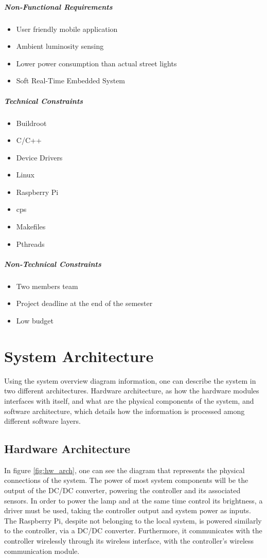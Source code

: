 \subparagraph{Non-Functional Requirements}
\begin{itemize}
	\item User friendly mobile application
	\item Ambient luminosity sensing
	\item Lower power consumption than actual street lights
	\item Soft Real-Time Embedded System
\end{itemize}

\subparagraph{Technical Constraints}
\begin{itemize}
	\item Buildroot
	\item C/C++ 
	\item Device Drivers
	\item Linux
	\item Raspberry Pi
	\item \ac{cps}
	\item Makefiles
	\item Pthreads
\end{itemize}

\subparagraph{Non-Technical Constraints}
\begin{itemize}
	\item Two members team
	\item Project deadline at the end of the semester
	\item Low budget
	
\end{itemize}

\section{System Architecture}
Using the system overview diagram information, one can describe the system in two different architectures. Hardware architecture, as how the hardware modules interfaces with itself, and what are the physical components of the system, and software architecture, which details how the information is processed among different software layers.

\subsection{Hardware Architecture}
In figure \ref{fig:hw_arch}, one can see the diagram that represents the physical connections of the system. The power of most system components will be the output of the DC/DC converter, powering the controller and its associated sensors. In order to power the lamp and at the same time control its brightness, a driver must be used, taking the controller output and system power as inputs. The Raspberry Pi, despite not belonging to the local system, is powered similarly to the controller, via a DC/DC converter. Furthermore, it communicates with the controller wirelessly through its wireless interface, with the controller's wireless communication module.


